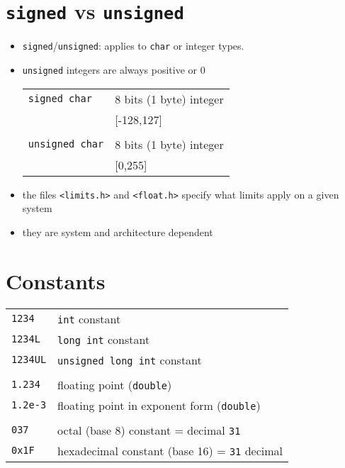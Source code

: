 \documentclass{article}
\begin{document}
\section{\texttt{signed} vs \texttt{unsigned}}
\begin{itemize}
\item \verb!signed!/\verb!unsigned!: applies to \verb!char! or integer types.
\item \verb!unsigned! integers are always positive or 0
\begin{tabular}{ll}
\verb!signed char! & 8 bits (1 byte) integer\\
& [-128,127]\\
\\
\verb!unsigned char! & 8 bits (1 byte) integer\\
& [0,255]\\
\end{tabular}
\item the files \verb!<limits.h>! and \verb!<float.h>! specify what limits apply on a given system
\item they are system and architecture dependent
\end{itemize}



\section{Constants}
\begin{tabular}{ll}
\verb!1234! & \verb!int! constant\\
\verb!1234L! & \verb!long int! constant\\
\verb!1234UL! & \verb!unsigned long int! constant\\
\\
\verb!1.234! & floating point (\verb!double!)\\
\verb!1.2e-3! & floating point in exponent form (\verb!double!)\\
\\
\verb!037! & octal (base 8) constant = decimal \verb!31!\\
\verb!0x1F! & hexadecimal constant (base 16) = \verb!31! decimal
\end{tabular}
\end{document}
